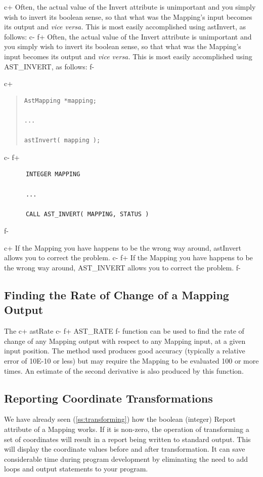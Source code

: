 \documentclass[twoside,11pt]{article}
\newcommand{\secref}[1]{\S\ref{#1}}
\renewcommand{\secref}[1]{\ref{#1}}
\begin{document}
c+
Often, the actual value of the Invert attribute is unimportant and you
simply wish to invert its boolean sense, so that what was the
Mapping's input becomes its output and {\em{vice versa.}} This is most
easily accomplished using astInvert, as follows:
c-
f+
Often, the actual value of the Invert attribute is unimportant and you
simply wish to invert its boolean sense, so that what was the
Mapping's input becomes its output and {\em{vice versa.}} This is most
easily accomplished using AST\_INVERT, as follows:
f-

c+
\begin{quote}
\small
\begin{verbatim}
AstMapping *mapping;

...

astInvert( mapping );
\end{verbatim}
\normalsize
\end{quote}
c-
f+
\small
\begin{verbatim}
      INTEGER MAPPING

      ...

      CALL AST_INVERT( MAPPING, STATUS )
\end{verbatim}
\normalsize
f-

c+
If the Mapping you have happens to be the wrong way around, astInvert
allows you to correct the problem.
c-
f+
If the Mapping you have happens to be the wrong way around,
AST\_INVERT allows you to correct the problem.
f-

\subsection{Finding the Rate of Change of a Mapping Output}
The
c+
astRate
c-
f+
AST\_RATE
f-
function can be used to find the rate of change of any Mapping output
with respect to any Mapping input, at a given input position. The method
used produces good accuracy (typically a relative error of 10E-10 or
less) but may require the Mapping to be evaluated 100 or more times. 
An estimate of the second derivative is also produced by this function.


\subsection{Reporting Coordinate Transformations}

We have already seen (\secref{ss:transforming}) how the boolean
(integer) Report attribute of a Mapping works. If it is non-zero, the
operation of transforming a set of coordinates will result in a report
being written to standard output. This will display the coordinate
values before and after transformation. It can save considerable time
during program development by eliminating the need to add loops and
output statements to your program.
\end{document}
